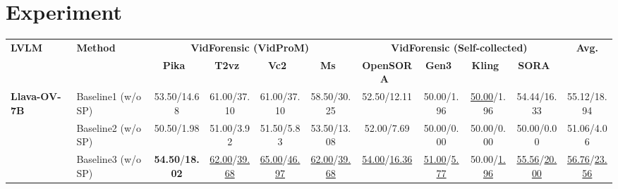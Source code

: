 \section{Experiment}
\label{sec:experiment}


\begin{table*}[t]
\centering
\scriptsize
\setlength{\tabcolsep}{3pt} %
\renewcommand{\arraystretch}{1.5} %
\begin{tabular}{ll|cccc|ccccc}
\toprule
\multirow{2}{*}{\textbf{LVLM}} & \multirow{2}{*}{\textbf{Method}} & \multicolumn{4}{c|}{\textbf{VidForensic (VidProM)~\cite{wang2024vidprommillionscalerealpromptgallery}}} & \multicolumn{4}{c}{\textbf{VidForensic (Self-collected)}} & \multirow{2}{*}{\textbf{Avg.}} \\ \cline{3-10}
                      &                         & \textbf{Pika~\cite{pika}}   & \textbf{T2vz~\cite{khachatryan2023text2videozerotexttoimagediffusionmodels}}  & \textbf{Vc2~\cite{chen2024videocrafter2overcomingdatalimitations}}  & \textbf{Ms~\cite{wang2023modelscopetexttovideotechnicalreport}}  & \textbf{OpenSORA~\cite{opensora}} & \textbf{Gen3~\cite{runway3}} & \textbf{Kling~\cite{klingai}} & \textbf{SORA~\cite{videoworldsimulators2024}} &                       \\  
\midrule
\multirow{4}{*}{\textbf{Llava-OV-7B}~\cite{li2024llavaonevisioneasyvisualtask}} & Baseline1 (w/o SP)    & 53.50/14.68      & 61.00/37.10     & 61.00/37.10    & 58.50/30.25   & 52.50/12.11        & 50.00/1.96    & \underline{50.00}/1.96     & 54.44/16.33    & 55.12/18.94                     \\ 

                             & Baseline2 (w/o SP)         & 50.50/1.98      & 51.00/3.92    & 51.50/5.83    & 53.50/13.08   & 52.00/7.69        & 50.00/0.00    & 50.00/0.00     & 50.00/0.00    & 51.06/4.06                     \\ 
                             
                             & Baseline3 (w/o SP)         & \textbf{54.50}/\textbf{18.02}      & \underline{62.00}/\underline{39.68}     & \underline{65.00}/\underline{46.97}    & \underline{62.00}/\underline{39.68}   & \underline{54.00}/\underline{16.36}        & \underline{51.00}/\underline{5.77}    & 50.00/\underline{1.96}     & \underline{55.56}/\underline{20.00}    & \underline{56.76}/\underline{23.56}                     \\ 
                             

\end{tabular}
\end{table*}
